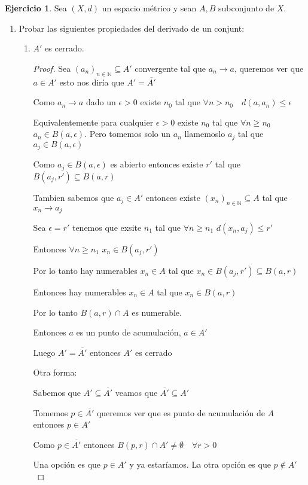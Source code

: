 \documentclass[12pt]{report}
\newcommand{\N}{\mathbb{N}}
\newcommand{\ra}{\rightarrow}
\newcommand{\ol}{\overline}
\theoremstyle{definition}
\newtheorem{ej}{Ejercicio}
\begin{document}
\begin{ej}
  Sea $(X,d)$ un espacio métrico y sean $A,B$ subconjunto de $X$.
  \begin{enumerate}
    \item Probar las siguientes propiedades del derivado de un conjunt:
      \begin{enumerate}
	\item $A'$ es cerrado.
	  \begin{proof}
	    Sea $(a_{n})_{n \in \N} \subseteq A'$ convergente tal que $a_{n} \ra a$, queremos ver que $a \in A'$ esto nos diría que $A' = \ol{A'}$

	    Como $a_{n} \ra a$ dado un $\epsilon > 0$ existe $n_{0}$ tal que $\forall n > n_{0} \quad d(a,a_{n}) \leq \epsilon$

	    Equivalentemente para cualquier $\epsilon > 0$ existe $n_{0}$ tal que $\forall n \geq n_{0}$ $a_{n} \in B(a,\epsilon)$. Pero tomemos solo un $a_{n}$ llamemoslo $a_{j}$ tal que $a_{j} \in B(a,\epsilon)$

	    Como $a_{j} \in B(a,\epsilon)$ es abierto entonces existe $r'$ tal que $B(a_{j},r') \subseteq B(a,r)$

	    Tambien sabemos que $a_{j} \in A'$ entonces existe $(x_{n})_{n \in \N} \subseteq A$ tal que $x_{n} \ra a_{j}$

	    Sea $\epsilon = r'$ tenemos que exsite  $n_{1}$ tal que $\forall n \geq n_{1}$ $d(x_{n}, a_{j}) \leq r'$

	    Entonces $\forall n \geq n_{1}$ $x_{n} \in B(a_{j},r')$

	    Por lo tanto hay numerables $x_{n} \in A$ tal que $x_{n}  \in B(a_{j},r') \subseteq B(a,r)$

	    Entonces hay numerables $x_{n} \in A$ tal que $x_{n} \in B(a,r)$

	    Por lo tanto $B(a,r) \cap A$ es numerable.

	    Entonces $a$ es un punto de acumulación, $a \in A'$

	    Luego $A' = \ol{A'}$ entonces $A'$ es cerrado

	    Otra forma:

	    Sabemos que $A'\subseteq \ol{A'}$ veamos que $\ol{A'} \subseteq A'$

	    Tomemos $p\in\ol{A'}$ queremos ver que es punto de acumulación de $A$ entonces $p \in A'$

	    Como $p \in \ol{A'}$ entonces $B(p,r) \cap A' \neq \emptyset \quad \forall r>0$

	    Una opción es que $p \in A'$ y ya estaríamos. La otra opción es que $p \notin A'$


\end{proof}
\end{enumerate}
\end{enumerate}
\end{ej}
\end{document}
